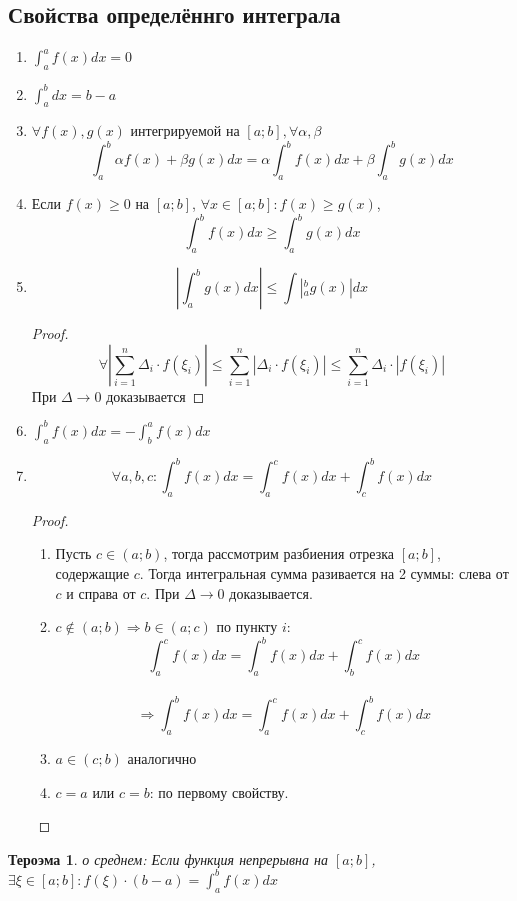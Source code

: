\documentclass[oneside]{book}
\newtheorem{thm}{Тероэма}[chapter] %
\begin{document}
\begin{enumerate}
\begin{itemize}
\begin{enumerate}
\section[Свойства]{Свойства определённго интеграла}
\begin{enumerate}
  \item $\int_{a}^a f(x) dx = 0$
  \item $\int_{a}^b dx = b-a$
  \item $\forall f(x), g(x)$ интегрируемой на $[a;b], \forall \alpha, \beta$ $$
          \int_{a}^b \alpha f(x) + \beta g(x) dx = \alpha \int_{a}^b f(x) dx + \beta \int_{a}^b g(x) dx
        $$
  \item Если $f(x) \geq 0$ на $[a;b]$, $\forall x \in [a;b]: f(x) \geq g(x)$, $$\int_{a}^b f(x) dx \geq \int_{a}^b g(x) dx$$
  \item $$|\int_{a}^b g(x) dx| \leq \int|_{a}^b g(x) |dx$$
  \begin{proof}
      $$ \forall |\sum_{i = 1}^n \Delta_i \cdot f(\xi_i)| \leq \sum_{i = 1}^n |\Delta_i \cdot f(\xi_i)| \leq \sum_{i = 1}^n \Delta_i \cdot |f(\xi_i)|$$
    При $\Delta \rightarrow 0$
    доказывается
    \end{proof}
  \item $\int_{a}^b f(x) dx = -\int_{b}^a f(x) dx$
  \item $$
    \forall a, b, c: \int_{a}^b f(x) dx = \int_{a}^c f(x) dx + \int_{c}^b f(x) dx
  $$
  \begin{proof}
    \begin{enumerate}
      \item Пусть $c \in (a;b)$, тогда рассмотрим разбиения отрезка $[a;b]$, содержащие $c$. Тогда интегральная сумма разивается на 2 суммы: слева от $c$
      и справа от $c$. При $\Delta \rightarrow 0$ доказывается.
      \item $c \not\in (a;b) \Rightarrow b \in (a;c)$ по пункту $i$:$$
        \int_{a}^c f(x) dx = \int_{a}^b f(x) dx + \int_{b}^c f(x) dx $$\\$$ \Rightarrow \int_{a}^b f(x) dx = \int_{a}^c f(x) dx + \int_{c}^b f(x) dx
      $$
      \item $a \in (c;b)$ аналогично
      \item $c = a$ или $c = b$: по первому свойству.
    \end{enumerate}
  \end{proof}
\end{enumerate}
\begin{thm}
  о среднем: Если функция непрерывна на $[a;b]$, $\exists \xi \in [a;b]: f(\xi) \cdot (b - a) = \int_{a}^b f(x) dx$

\end{thm}
\end{enumerate}
\end{itemize}
\end{enumerate}
\end{document}
